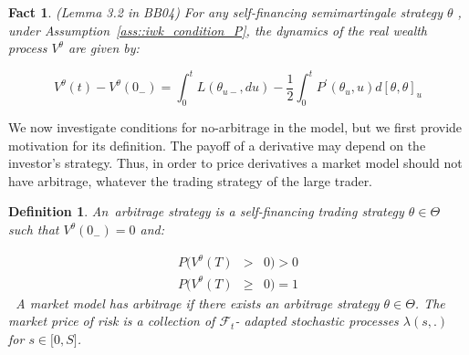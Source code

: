 \documentclass{article}
\newtheorem{definition}{Definition}
\newtheorem{fact}[theorem]{Fact}
\begin{document}


\begin{fact}
(Lemma 3.2 in BB04) For any self-financing semimartingale strategy $\theta $%
, under Assumption~\ref{ass::iwk_condition_P}, the dynamics of the real
wealth process $V^{\theta }$ are given by:
\end{fact}

\begin{equation}
V^{\theta }(t)-V^{\theta }(0_{-})=\int_{0}^{t}L(\theta _{u-},du)-\frac{1}{2}%
\int_{0}^{t}P^{\prime }(\theta _{u},u)d[\theta ,\theta ]_{u}
\label{lemma32BB04}
\end{equation}%
\bigskip

We now investigate conditions for no-arbitrage in the model, but we first
provide motivation for its definition. The payoff of a derivative may depend
on the investor's strategy. Thus, in order to price derivatives a market
model should not have arbitrage, whatever the trading strategy of the large
trader.

\bigskip


\begin{definition}
An\textit{\ arbitrage strategy} is a self-financing trading strategy $\theta
\in \Theta $ such that $V^{\theta }(0_{-})=0$ and:

\begin{eqnarray*}
P(V^{\theta }(T) &>&0)>0 \\
P(V^{\theta }(T) &\geq &0)=1
\end{eqnarray*}%
\bigskip \textbf{\ }A \textit{market model has arbitrage} if there exists an
arbitrage strategy $\theta \in \Theta $. The \textit{market price of risk}
is a collection of $\mathcal{F}_{t}$- adapted stochastic processes $\lambda
(s,.)$ for $s\in \lbrack 0,S]$.
\end{definition}


\end{document}
